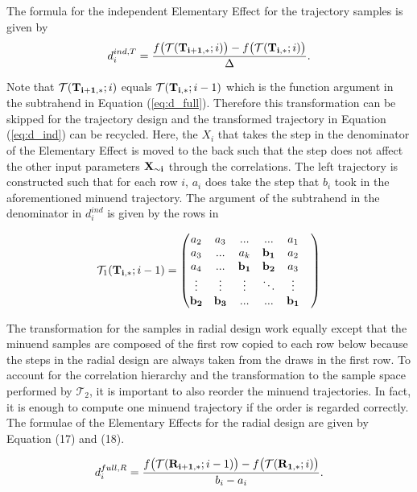 \noindent
The formula for the independent Elementary Effect for the trajectory samples is given by
\begin{align} \label{eq:d_ind}
d_i^{ind, T} = \frac{f\big(\mathcal{T}(\bold{T_{i+1,*}}; i)\big) - f\big(\mathcal{T}(\bold{T_{i,*}}; i)\big)}{\Delta}.
\end{align}

\noindent
Note that $\mathcal{T}(\bold{T_{i+1,*}}; i)$ equals $\mathcal{T}(\bold{T_{i,*}}; i-1)$ which is the function argument in the subtrahend in Equation (\ref{eq:d_full}). Therefore this transformation can be skipped for the trajectory design and the transformed trajectory in Equation (\ref{eq:d_ind}) can be recycled. Here, the $X_i$ that takes the step in the denominator of the Elementary Effect is moved to the back such that the step does not affect the other input parameters $\bold{X_{\sim i}}$ through the correlations. The left trajectory is constructed such that for each row $i$, $a_i$ does take the step that $b_i$ took in the aforementioned minuend trajectory. The argument of the subtrahend in the denominator in $d_i^{ind}$ is given by the rows in

\begin{align}
\mathcal{T}_1(\bold{T_{i,*}}; i-1)=
\begin{pmatrix}
a_2 & a_3 & ... & ... &  a_1 \\
a_3 & ... & a_k &  \bold{b_1} & a_2 \\
a_4 & ... & \bold{b_1} &  \bold{b_2} & a_3 & \\
\vdots & \vdots & \vdots & 	\ddots &  \vdots\\
\bold{b_2} & \bold{b_{3}} & ... & ... &  \bold{b_{1}}
\end{pmatrix}
\end{align}

\noindent
The transformation for the samples in radial design work equally except that the minuend samples are composed of the first row copied to each row below because the steps in the radial design are always taken from the draws in the first row. To account for the correlation hierarchy and the transformation to the sample space performed by $\mathcal{T}_2$, it is important to also reorder the minuend trajectories. In fact, it is enough to compute one minuend trajectory if the order is regarded correctly. The formulae of the Elementary Effects for the radial design are given by Equation (17) and (18).

\begin{align}
d_i^{full, R} = \frac{f\big(\mathcal{T}(\bold{R_{i+1,*}}; i-1)\big) - f\big(\mathcal{T}(\bold{R_{1,*}}; i)\big)}{b_i - a_i}.
\end{align}

